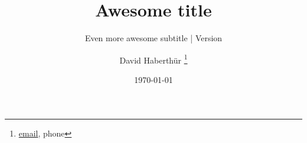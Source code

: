 \documentclass[paper=a4,DIV=calc,twoside]{scrartcl}
\title{Awesome title}
\subtitle{Even more awesome subtitle | Version \gitAbbrevHash}
\author{David Haberthür%
	\thanks{\href{mailto:email}{email}, phone}%
	 }
\date{\today}
\begin{document}
\maketitle

\blinddocument

\printbibliography
\end{document}
